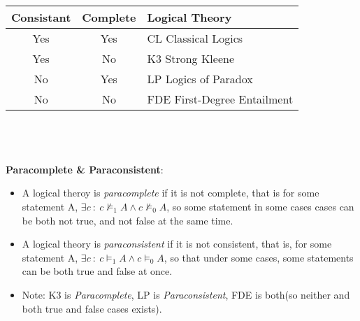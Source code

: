 \documentclass{article}
\begin{document}
\begin{tabular}{c | c| l}
    \hline
    Consistant & Complete & Logical Theory\\
    \hline
    Yes & Yes & CL Classical Logics\\
    
    Yes & No & K3 Strong Kleene\\
    No & Yes & LP Logics of Paradox \\
    No & No & FDE First-Degree Entailment\\
    \hline
    
\end{tabular}\\  \\ \\


\noindent\textbf{Paracomplete \& Paraconsistent}: 
\begin{itemize}
    \large
    \item A logical theroy is \emph{paracomplete} 
    if it is not complete, that is for some statement A, $\exists c\ :\  c\not \models_1 A \wedge c \not \models_0 A$,
    so some statement in some cases cases can be both not true, and not false at the same time.
    \item A logical theory is \emph{paraconsistent} if it is not consistent, that is, for some statement A, 
    $\exists c \ :\ c \models_1 A \wedge c \models_0 A$, so that under some cases, some statements can be 
    both true and false at once.
    \item Note: K3 is \emph{Paracomplete}, LP is \emph{Paraconsistent}, FDE is both(so neither and both true and false cases exists).
    
\end{itemize}
\bigskip
\end{document}

